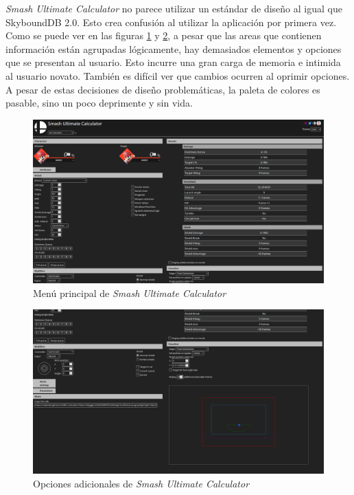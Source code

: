 \newpage

\textit{Smash Ultimate Calculator} no parece utilizar un estándar de diseño al igual que SkyboundDB 2.0. Esto crea confusión al utilizar la aplicación por primera vez. Como se puede ver en las figuras \ref{fig: SUC main menu} y \ref{fig: SUC additional options}, a pesar que las areas que contienen información están agrupadas lógicamente, hay demasiados elementos y opciones que se presentan al usuario. Esto incurre una gran carga de memoria e intimida al usuario novato. También es difícil ver que cambios ocurren al oprimir opciones. A pesar de estas decisiones de diseño problemáticas, la paleta de colores es pasable, sino un poco deprimente y sin vida.

\begin{figure}[ht!]
    \centering
    \includegraphics[width=\textwidth]{figures/SUC1.png}
    \caption{Menú principal de \textit{Smash Ultimate Calculator}}
    \label{fig: SUC main menu}
\end{figure}

\begin{figure}
    \centering
    \includegraphics[width=\textwidth]{figures/SUC2.png}
    \caption{Opciones adicionales de \textit{Smash Ultimate Calculator}}
    \label{fig: SUC additional options}
\end{figure}